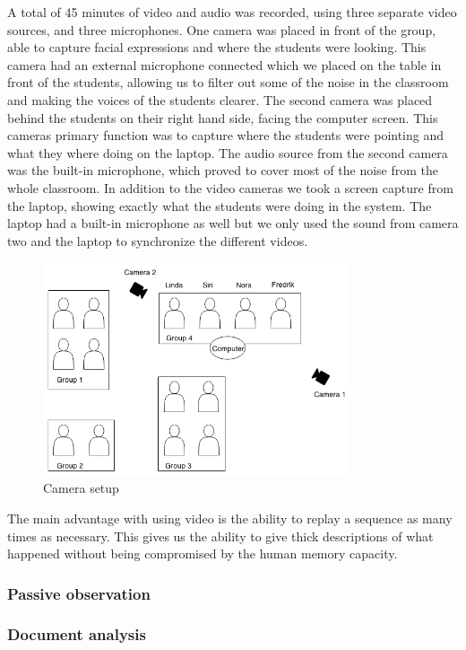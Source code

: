 A total of 45 minutes of video and audio was recorded, using three separate video sources, and three microphones. One camera was placed in front of the group, able to capture facial expressions and where the students were looking. This camera had an external microphone connected which we placed on the table in front of the students, allowing us to filter out some of the noise in the classroom and making the voices of the students clearer. The second camera was placed behind the students on their right hand side, facing the computer screen. This cameras primary function was to capture where the students were pointing and what they where doing on the laptop. The audio source from the second camera was the built-in microphone, which proved to cover most of the noise from the whole classroom. In addition to the video cameras we took a screen capture from the laptop, showing exactly what the students were doing in the system. The laptop had a built-in microphone as well but we only used the sound from camera two and the laptop to synchronize the different videos.
\begin{figure}
\centering
\includegraphics[width=0.8\textwidth]{img/empiricalsetting/class_diagram.png}
\caption{Camera setup}
\label{fig:camerasetup}
\end{figure}

The main advantage with using video is the ability to replay a sequence as many times as necessary. This gives us the ability to give thick descriptions of what happened without being compromised by the human memory capacity.

\subsubsection{Passive observation}

\subsubsection{Document analysis}

